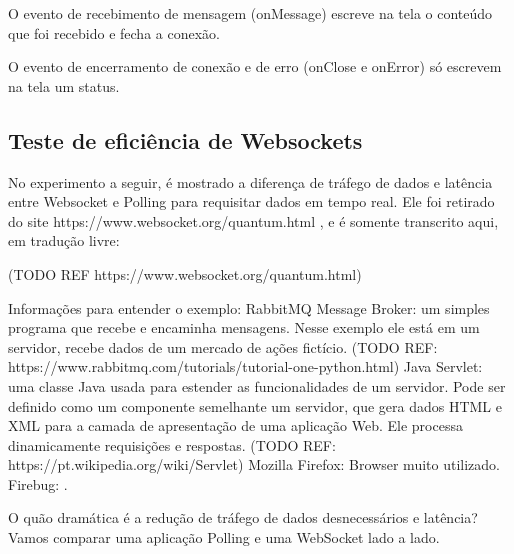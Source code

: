 \documentclass[a4paper,12pt]{article}
\begin{document}
O evento de recebimento de mensagem (onMessage) escreve na tela o conteúdo que foi recebido e fecha a conexão.

O evento de encerramento de conexão e de erro (onClose e onError) só escrevem na tela um status.





\subsection{Teste de eficiência de Websockets}


No experimento a seguir, é mostrado a diferença de tráfego de dados e latência entre Websocket e Polling para requisitar dados em tempo real. Ele foi retirado do site https://www.websocket.org/quantum.html , e é somente transcrito aqui, em tradução livre:

(TODO REF https://www.websocket.org/quantum.html)


Informações para entender o exemplo:
RabbitMQ Message Broker: um simples programa que recebe e encaminha mensagens. Nesse exemplo ele está em um servidor, recebe dados de um mercado de ações fictício. (TODO REF: https://www.rabbitmq.com/tutorials/tutorial-one-python.html)
Java Servlet: uma classe Java usada para estender as funcionalidades de um servidor. Pode ser definido como um componente semelhante um servidor, que gera dados HTML e XML para a camada de apresentação de uma aplicação Web. Ele processa dinamicamente requisições e respostas. (TODO REF: https://pt.wikipedia.org/wiki/Servlet)
Mozilla Firefox: Browser muito utilizado.
Firebug: .

O quão dramática é a redução de tráfego de dados desnecessários e latência? Vamos comparar uma aplicação Polling e uma WebSocket lado a lado.
\end{document}
